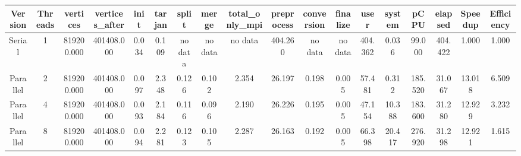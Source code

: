 \begin{tabular}{|c|c|c|c|c|c|c|c|c|c|c|c|c|c|c|c|c|c|}
\toprule
 Version &  Threads &   vertices &  vertices\_after &  init &  tarjan &   split &   merge & total\_only\_mpi &  preprocess & conversion & finalize &    user &  system &    pCPU &  elapsed &  Speedup &  Efficiency \\
\midrule
  Serial &        1 & 819200.000 &      401408.000 & 0.034 &   0.109 & no data & no data &        no data &     404.260 &    no data &  no data & 404.362 &   0.036 &  99.000 &  404.422 &    1.000 &       1.000 \\
Parallel &        2 & 819200.000 &      401408.000 & 0.097 &   2.348 &   0.126 &   0.102 &          2.354 &      26.197 &      0.198 &    0.005 &  57.481 &   0.312 & 185.520 &   31.067 &   13.018 &       6.509 \\
Parallel &        4 & 819200.000 &      401408.000 & 0.093 &   2.184 &   0.116 &   0.096 &          2.190 &      26.226 &      0.195 &    0.005 &  47.154 &  10.388 & 183.600 &   31.280 &   12.929 &       3.232 \\
Parallel &        8 & 819200.000 &      401408.000 & 0.094 &   2.281 &   0.123 &   0.105 &          2.287 &      26.163 &      0.192 &    0.005 &  66.398 &  20.417 & 276.920 &   31.298 &   12.921 &       1.615 \\
\bottomrule
\end{tabular}
